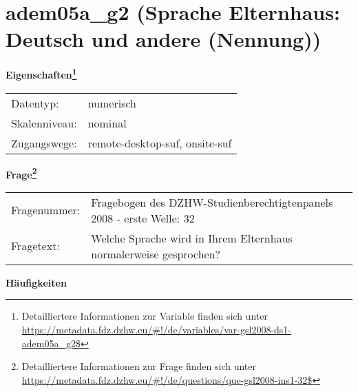 
    \setcounter{footnote}{0}

    \vspace*{-1.8cm}
	\section{adem05a\_g2 (Sprache Elternhaus: Deutsch und andere (Nennung))}
	\label{section:adem05a_g2}



    \vspace*{0.5cm}
    \noindent\textbf{Eigenschaften\footnote{Detailliertere Informationen zur Variable finden sich unter
		\url{https://metadata.fdz.dzhw.eu/\#!/de/variables/var-gsl2008-ds1-adem05a_g2$}}}\\
	\begin{tabularx}{\hsize}{@{}lX}
	Datentyp: & numerisch \\
	Skalenniveau: & nominal \\
	Zugangswege: &
	  remote-desktop-suf, 
	  onsite-suf
 \\
    \end{tabularx}



				\vspace*{0.5cm}
                \noindent\textbf{Frage\footnote{Detailliertere Informationen zur Frage finden sich unter
		              \url{https://metadata.fdz.dzhw.eu/\#!/de/questions/que-gsl2008-ins1-32$}}}\\
				\begin{tabularx}{\hsize}{@{}lX}
					Fragenummer: &
					  Fragebogen des DZHW-Studienberechtigtenpanels 2008 - erste Welle:
					  32
 \\
					Fragetext: & Welche Sprache wird in Ihrem Elternhaus normalerweise gesprochen? \\
				\end{tabularx}





        		\vspace*{0.5cm}
                \noindent\textbf{Häufigkeiten}

